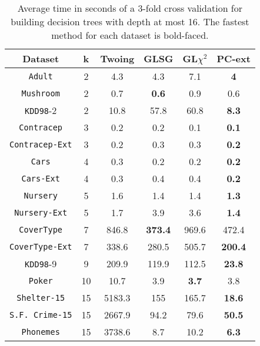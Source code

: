 \begin{table}[]
\small
\caption{Average time in seconds of a 3-fold cross validation
for building decision trees with depth at most 16.
The fastest method for each dataset is bold-faced.}
\centering
\begin{tabular}{c|c|c|c|c|c}
Dataset             & k  & Twoing        & GLSG      & GL$\chi^2$  & PC-ext    \\ \hline
{\tt Adult}         & 2  & 4.3           & 4.3       & 7.1         &{\bf 4}    \\
{\tt Mushroom}      & 2  & 0.7           & {\bf 0.6} & 0.9         & 0.6       \\
{\tt KDD98}-2       & 2  & 10.8          & 57.8      & 60.8        &{\bf 8.3}  \\
{\tt Contracep}     & 3  & 0.2           & 0.2       & 0.1         &{\bf 0.1}  \\
{\tt Contracep-Ext} & 3  & 0.2           & 0.3       & 0.3         &{\bf 0.2}  \\
{\tt Cars}          & 4  & 0.3           & 0.2       & 0.2         &{\bf 0.2}  \\
{\tt Cars-Ext}      & 4  & 0.3           & 0.4       & 0.4         &{\bf 0.2}  \\
{\tt Nursery}       & 5  & 1.6           & 1.4       & 1.4         &{\bf 1.3}  \\
{\tt Nursery-Ext}   & 5  & 1.7           & 3.9       & 3.6         &{\bf 1.4}  \\
{\tt CoverType}     & 7  & 846.8         &{\bf 373.4}& 969.6       & 472.4     \\
{\tt CoverType-Ext} & 7  & 338.6         & 280.5     & 505.7       &{\bf 200.4}\\
{\tt KDD98}-9       & 9  & 209.9         & 119.9     & 112.5       &{\bf 23.8} \\
{\tt Poker}         & 10 & 10.7          & 3.9       & {\bf 3.7}   & 3.8       \\ 
{\tt Shelter-15}    & 15 & 5183.3        & 155       & 165.7       &{\bf 18.6} \\   
{\tt S.F. Crime-15} & 15 & 2667.9        & 94.2      & 79.6        &{\bf 50.5} \\ 
{\tt Phonemes}      & 15 & 3738.6        & 8.7       & 10.2        &{\bf 6.3}
\end{tabular}
\label{tab:time-16}
\end{table}


